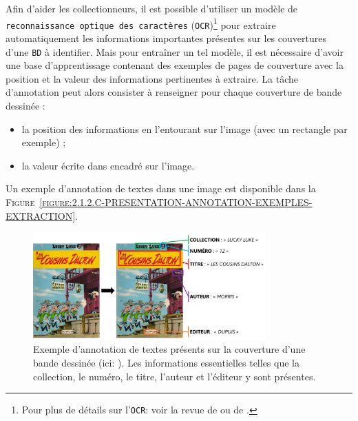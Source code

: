 			Afin d'aider les collectionneurs, il est possible d'utiliser un modèle de \texttt{reconnaissance optique des caractères} (\texttt{OCR})\footnote{Pour plus de détails sur l'\texttt{OCR}: voir la revue de \cite{berchmans-kumar:2014:optical-character-recognition} ou de \cite{awel-abidi:2019:review-optical-character}.} pour extraire automatiquement les informations importantes présentes sur les couvertures d'une \texttt{BD} à identifier.
			Mais pour entraîner un tel modèle, il est nécessaire d'avoir une base d'apprentissage contenant des exemples de pages de couverture avec la position et la valeur des informations pertinentes à extraire.
			La tâche d'annotation peut alors consister à renseigner pour chaque couverture de bande dessinée :
			\begin{itemize}
				\item la position des informations en l'entourant sur l'image (avec un rectangle par exemple) ;
				\item la valeur écrite dans encadré sur l'image.
			\end{itemize}
			
			Un exemple d'annotation de textes dans une image est disponible dans la \textsc{Figure~\ref{figure:2.1.2.C-PRESENTATION-ANNOTATION-EXEMPLES-EXTRACTION}}.
			\begin{leftBarExamples}
				\begin{figure}[H]
					\centering
					\includegraphics[width=0.80\textwidth]{figures/etatdelart-morris-1958-lucky-luke-12}
					\caption{
						Exemple d'annotation de textes présents sur la couverture d'une bande dessinée (ici: \cite{morris-goscinny:1958:cousins-dalton}).
						Les informations essentielles telles que la collection, le numéro, le titre, l'auteur et l'éditeur y sont présentes. 
					}
					\label{figure:2.1.2-PRESENTATION-ANNOTATION-EXEMPLES-IMAGE-OCR}
				\end{figure}
			\end{leftBarExamples}
			
